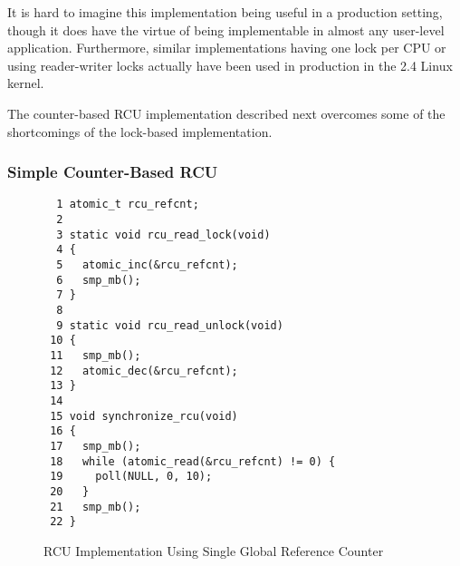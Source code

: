  \QuickQuizEnd

It is hard to imagine this implementation being useful
in a production setting, though it does have the virtue
of being implementable in almost any user-level application.
Furthermore, similar implementations having one lock per CPU
or using reader-writer locks actually have been used in production
in the 2.4 Linux kernel.

The counter-based RCU implementation described next overcomes some of
the shortcomings of the lock-based implementation.

\subsubsection{Simple Counter-Based RCU}
\label{defer:Simple Counter-Based RCU}

\begin{figure}[tbp]
{ \scriptsize
\begin{verbatim}
  1 atomic_t rcu_refcnt;
  2 
  3 static void rcu_read_lock(void)
  4 {
  5   atomic_inc(&rcu_refcnt);
  6   smp_mb();
  7 }
  8 
  9 static void rcu_read_unlock(void)
 10 {
 11   smp_mb();
 12   atomic_dec(&rcu_refcnt);
 13 }
 14 
 15 void synchronize_rcu(void)
 16 {
 17   smp_mb();
 18   while (atomic_read(&rcu_refcnt) != 0) {
 19     poll(NULL, 0, 10);
 20   }
 21   smp_mb();
 22 }
\end{verbatim}
}
\caption{RCU Implementation Using Single Global Reference Counter}
\label{fig:defer:RCU Implementation Using Single Global Reference Counter}
\end{figure}


